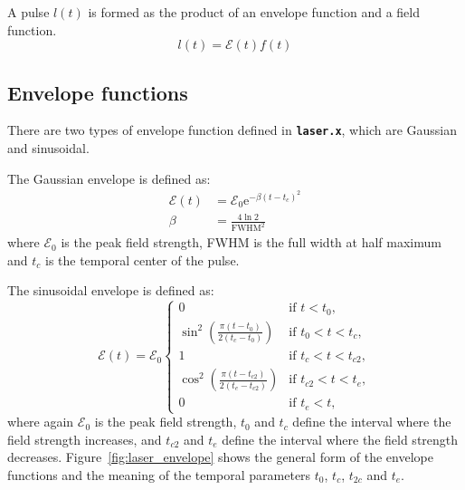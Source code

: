 \documentclass[a4paper,11pt,DIV=15,openany,twoside=false]{scrbook}
\newcommand{\ttt}[1]{\textbf{\texttt{#1}}}
\newcommand{\E}{\ensuremath{\mathrm{e}}}
\begin{document}
A pulse $l(t)$ is formed as the product of an envelope function and a field function. 
\begin{equation}
  l(t)=\mathcal{E}(t)f(t)
\end{equation}

\subsection{Envelope functions}

There are two types of envelope function defined in \ttt{laser.x}, which are Gaussian and sinusoidal.

The Gaussian envelope is defined as:
\begin{align}
  \mathcal{E}(t)&=\mathcal{E}_0 \E^{-\beta(t-t_c)^2}\label{eq:laser_gauss_1}\\
  \beta&=\frac{4\ln 2}{\mathrm{FWHM}^2}\label{eq:laser_gauss_2}
\end{align}
where $\mathcal{E}_0$ is the peak field strength, FWHM is the full width at half maximum and $t_c$ is the temporal center of the pulse.

The sinusoidal envelope is defined as:
\begin{equation}
  \mathcal{E}(t)=\mathcal{E}_0
  \begin{cases}
    0                                                   &\text{if } t<t_0,\\
    \sin^2\left(\frac{\pi(t-t_0)}{2(t_c-t_0)}\right)      &\text{if } t_0<t<t_c,\\
    1                                                   &\text{if } t_c<t<t_{c2},\\
    \cos^2\left(\frac{\pi(t-t_{c2})}{2(t_e-t_{c2})}\right)      &\text{if } t_{c2}<t<t_e,\\
    0                                                   &\text{if } t_e<t,\label{eq:laser_sinus}
  \end{cases}
\end{equation}
where again $\mathcal{E}_0$ is the peak field strength, $t_0$ and $t_c$ define the interval where the field strength increases, and $t_{c2}$ and $t_e$ define the interval where the field strength decreases. Figure~\ref{fig:laser_envelope} shows the general form of the envelope functions and the meaning of the temporal parameters $t_0$, $t_c$, $t_{2c}$ and $t_e$.
\end{document}
